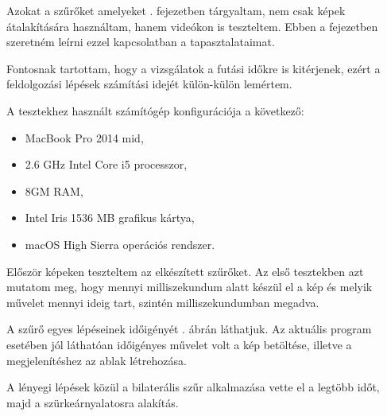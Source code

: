 
\label{chap:tests}

Azokat a szűrőket amelyeket . fejezetben tárgyaltam, nem csak képek átalakítására használtam, hanem videókon is teszteltem. Ebben a fejezetben szeretném leírni ezzel kapcsolatban a tapasztalataimat. 

Fontosnak tartottam, hogy a vizsgálatok a futási időkre is kitérjenek, ezért a feldolgozási lépések számítási idejét külön-külön lemértem.

A tesztekhez használt számítógép konfigurációja a következő:
\begin{itemize}
\item MacBook Pro 2014 mid,
\item 2.6 GHz Intel Core i5 processzor,
\item 8GM RAM,
\item Intel Iris 1536 MB grafikus kártya,
\item macOS High Sierra operációs rendszer.
\end{itemize}


Először képeken teszteltem az elkészített szűrőket. Az első tesztekben azt mutatom meg, hogy mennyi milliszekundum alatt készül el a kép és melyik művelet mennyi ideig tart, szintén milliszekundumban megadva.

\newpage


A szűrő egyes lépéseinek időigényét . ábrán láthatjuk. Az aktuális program esetében jól láthatóan időigényes művelet volt a kép betöltése, illetve a megjelenítéshez az ablak létrehozása.

A lényegi lépések közül a bilaterális szűr alkalmazása vette el a legtöbb időt, majd a szürkeárnyalatosra alakítás.


